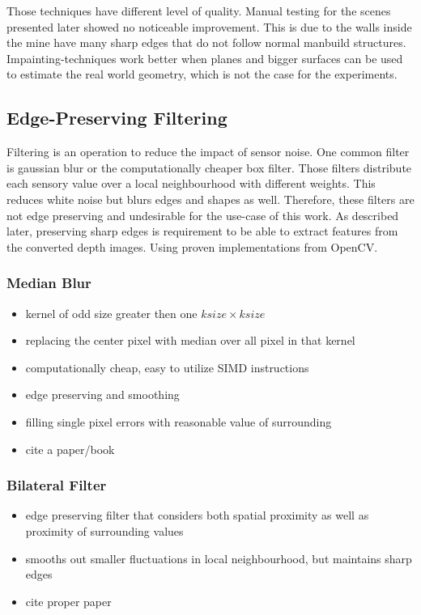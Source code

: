 Those techniques have different level of quality.
Manual testing for the scenes presented later showed no noticeable improvement.
This is due to the walls inside the mine have many sharp edges that do not follow normal manbuild structures.
Impainting-techniques work better when planes and bigger surfaces can be used to estimate the real world geometry, which is not the case for the experiments.

\subsection{Edge-Preserving Filtering}

Filtering is an operation to reduce the impact of sensor noise.
One common filter is gaussian blur or the computationally cheaper box filter.
Those filters distribute each sensory value over a local neighbourhood with different weights.
This reduces white noise but blurs edges and shapes as well.
Therefore, these filters are not edge preserving and undesirable for the use-case of this work.
As described later, preserving sharp edges is requirement to be able to extract features from the converted depth images.
Using proven implementations from OpenCV\cite{opencv_library}.

\subsubsection{Median Blur}

\begin{itemize}
    \item kernel of odd size greater then one $ksize \times ksize$
    \item replacing the center pixel with median over all pixel in that kernel
    \item computationally cheap, easy to utilize SIMD instructions
    \item edge preserving and smoothing
    \item filling single pixel errors with reasonable value of surrounding
    \item cite a paper/book
\end{itemize}

\subsubsection{Bilateral Filter}

\begin{itemize}
    \item edge preserving filter that considers both spatial proximity as well as proximity of surrounding values
    \item smooths out smaller fluctuations in local neighbourhood, but maintains sharp edges
    \item cite proper paper
\end{itemize}


